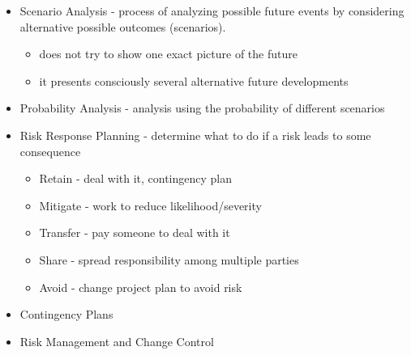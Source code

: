 \documentclass[8pt, letter]{extarticle}
\begin{document}
\begin{multicols}{2}
\begin{itemize}
        \item Scenario Analysis - process of analyzing possible future events by considering alternative possible outcomes (scenarios). 
            \begin{itemize}
                \item does not try to show one exact picture of the future
                \item it presents consciously several alternative future developments
            \end{itemize}
        \item Probability Analysis - analysis using the probability of different scenarios
        \item Risk Response Planning - determine what to do if a risk leads to some consequence
            \begin{itemize}
                \item Retain - deal with it, contingency plan
                \item Mitigate - work to reduce likelihood/severity
                \item Transfer - pay someone to deal with it
                \item Share - spread responsibility among multiple parties
                \item Avoid - change project plan to avoid risk
            \end{itemize}
        \item Contingency Plans
        \item Risk Management and Change Control
    \end{itemize}


\end{multicols}
\end{document}
